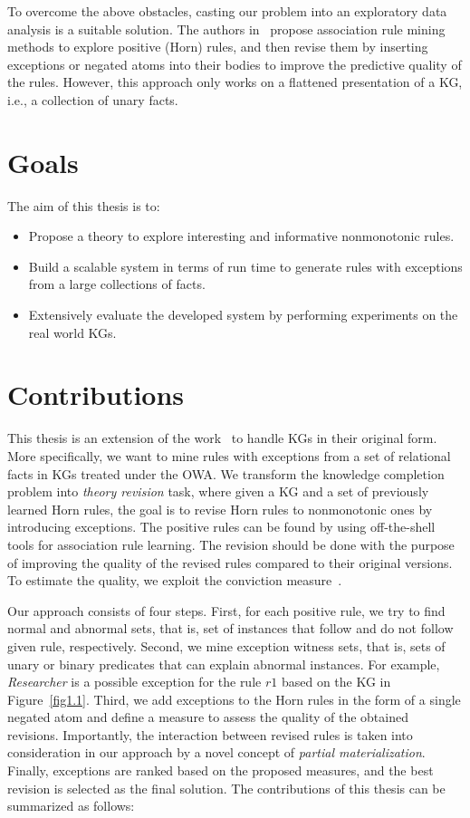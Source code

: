 To overcome the above obstacles, casting our problem into an exploratory data analysis is a suitable solution. The authors in~\cite{ref12} propose association rule mining methods to explore positive (Horn) rules, and then revise them by inserting exceptions or negated atoms into their bodies to improve the predictive quality of the rules. However, this approach only works on a flattened presentation of a KG, i.e., a collection of unary facts.

\section{Goals}

The aim of this thesis is to:
\begin{itemize}
\item Propose a theory to explore interesting and informative nonmonotonic rules.
\item Build a scalable system in terms of run time to generate rules with exceptions from a large collections of facts.
\item Extensively evaluate the developed system by performing experiments on the real world KGs.
\end{itemize}

\section{Contributions}

This thesis is an extension of the work~\cite{ref12} to handle KGs in their original form. More specifically, we want to mine rules with exceptions from a set of relational facts in KGs treated under the OWA. We transform the knowledge completion problem into \textit{theory revision} task, where given a KG and a set of previously learned Horn rules, the goal is to revise Horn rules to nonmonotonic ones by introducing exceptions. The positive rules can be found by using off-the-shell tools for association rule learning. The revision should be done with the purpose of improving the quality of the revised rules compared to their original versions. To estimate the quality, we exploit the conviction measure~\cite{ref48}.

Our approach consists of four steps. First, for each positive rule, we try to find normal and abnormal sets, that is, set of instances that follow and do not follow given rule, respectively. Second, we mine exception witness sets, that is, sets of unary or binary predicates that can explain abnormal instances. For example, \textit{Researcher} is a possible exception for the rule $r1$ based on the KG in Figure~\ref{fig1.1}. Third, we add exceptions to the Horn rules in the form of a single negated atom and define a measure to assess the quality of the obtained revisions. Importantly, the interaction between revised rules is taken into consideration in our approach by a novel concept of \textit{partial materialization}. Finally, exceptions are ranked based on the proposed measures, and the best revision is selected as the final solution. The contributions of this thesis can be summarized as follows:

